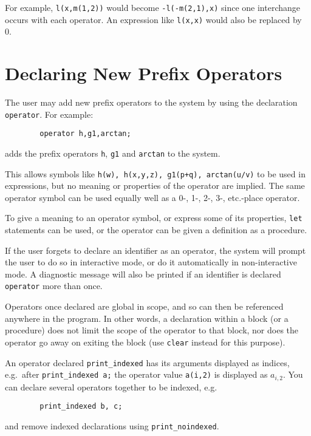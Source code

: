 For example, \texttt{l(x,m(1,2))} would become \texttt{-l(-m(2,1),x)} since one
interchange occurs with each operator.  An expression like \texttt{l(x,x)}
would also be replaced by 0.

\section{Declaring New Prefix Operators}
\hypertarget{command:OPERATOR}{}

The user may add new prefix operators to the system by
using the declaration \texttt{operator}. For example:
\begin{verbatim}
        operator h,g1,arctan;
\end{verbatim}
adds the prefix operators \texttt{h}, \texttt{g1} and \texttt{arctan} to the system.

This allows symbols like \texttt{h(w), h(x,y,z), g1(p+q), arctan(u/v)} to be
used in expressions, but no meaning or properties of the operator are
implied.  The same operator symbol can be used equally well as a 0-, 1-, 2-,
3-, etc.-place operator.

To give a meaning to an operator symbol, or express some of its
properties, \texttt{let} statements can be used, or the operator
can be given a definition as a procedure.

If the user forgets to declare an identifier as an operator, the system
will prompt the user to do so in interactive mode, or do it automatically
in non-interactive mode. A diagnostic message will also be printed if an
identifier is declared \texttt{operator} more than once.

Operators once declared are global in scope, and so can then be referenced
anywhere in the program.  In other words, a declaration within a block (or
a procedure) does not limit the scope of the operator to that block, nor
does the operator go away on exiting the block (use \texttt{clear} instead
for this purpose).

\hypertarget{command:PRINT_INDEXED}{}\hypertarget{command:PRINT_NOINDEXED}{}

An operator declared
\texttt{print\_indexed} has
its arguments displayed as indices, e.g.\ after
\texttt{print\_indexed~a;} the operator value \texttt{a(i,2)} is
displayed as \(a_{i,2}\).  You can declare several operators together
to be indexed, e.g.
\begin{verbatim}
        print_indexed b, c;
\end{verbatim}
and remove indexed declarations using
\texttt{print\_noindexed}.


